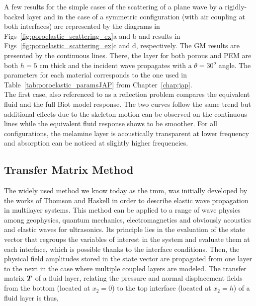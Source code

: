 A few results for the simple cases of the scattering of a plane wave by a rigidly-backed layer and in the case of a symmetric configuration (with air coupling at both interfaces) are represented by the diagrams in Figs~\ref{fig:poroelastic_scattering_ex}a and b and results in Figs~\ref{fig:poroelastic_scattering_ex}c and d, respectively. The GM results are presented by the continuous lines. There, the layer for both porous and PEM are both $h=5$ cm thick and the incident wave propagates with a $\theta=30^o$ angle. The parameters for each material corresponds to the one used in Table~\ref{tab:poroelastic_paramsJAP} from Chapter~\ref{chap:jap}.\\

The first case, also referenced to as a reflection problem compares the equivalent fluid and the full Biot model response. The two curves follow the same trend but additional effects due to the skeleton motion can be observed on the continuous lines while the equivalent fluid response shows to be smoother. For all configurations, the melamine layer is acoustically transparent at lower frequency and absorption can be noticed at slightly higher frequencies. 


\subsection{Transfer Matrix Method}
The widely used method we know today as the \acrfull{tmm}, was initially developed by the works of Thomson \cite{thomson1950} and Haskell \cite{haskell1953} in order to describe elastic wave propagation in multilayer systems. This method can be applied to a range of wave physics among geophysics, quantum mechanics, electromagnetics and obviously acoustics \cite{bruneau2006, markos2008,jimenez2021} and elastic waves for ultrasonics\cite{lowe1995}. Its principle lies in the evaluation of the state vector that regroups the variables of interest in the system and evaluate them at each interface, which is possible thanks to the interface conditions. Then, the physical field amplitudes stored in the state vector are propagated from one layer to the next in the case where multiple coupled layers are modeled. The transfer matrix $\boldsymbol T$ of a fluid layer, relating the pressure and normal displacement fields from the bottom (located at $x_2 = 0$) to the top interface (located at $x_2 = h$) of a fluid layer is thus, \cite{bruneau2006}


